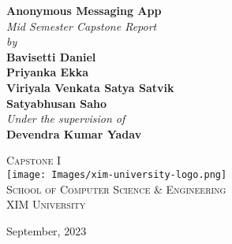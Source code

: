 
\begin{titlepage}
\vbox{ }
\vbox{ }
\begin{center}

{ \huge \bfseries Anonymous Messaging App}\\[2cm]
\textit{\large Mid Semester Capstone Report} \\
\vspace{0.2in}
\textit{\large by} \\
\vspace{0.2in}
\textbf{Bavisetti Daniel \\ Priyanka Ekka \\ Viriyala Venkata Satya Satvik \\ Satyabhusan Saho} \\
\vspace{2cm}
\textit{\large Under the supervision of} \\
\vspace{0.2in}
\textbf{Devendra Kumar Yadav}
\vspace{2.5cm}

\textsc{\Large Capstone I}\\[3cm]

\texttt{[image: Images/xim-university-logo.png]}\\[0.5cm]
\textsc{\LARGE School of Computer Science \& Engineering}\\[0.5cm]
\textsc{\LARGE XIM University}\\[0.5cm]
\vbox{ }

{\large September, 2023}
\end{center}
\end{titlepage}